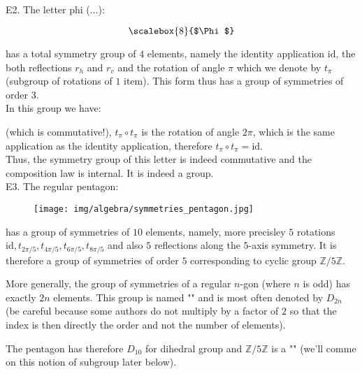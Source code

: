 	\pagebreak
	\begin{tcolorbox}[colframe=black,colback=white,sharp corners]
	E2. The letter phi (...):
	\begin{center}
	\[ \scalebox{8}{$\Phi$} \]
	\end{center}
	has a total symmetry group of $4$ elements, namely the identity application $\text{id}$, the both reflections $r_h$ and $r_v$ and the rotation of angle $\pi$ which we denote by $t_\pi$ (subgroup of rotations of $1$ item). This form thus has a group of symmetries of order $3$.\\
	
	In this group we have:
	
 	(which is commutative!), $t_{\pi}\circ t_{\pi}$ is the rotation of angle $2\pi$, which is the same application as the identity application, therefore $t_{\pi}\circ t_\pi=\text{id}$.\\
 	
 	Thus, the symmetry group of this letter is indeed commutative and the composition law is internal. It is indeed a group.\\
 	
 	E3. The regular pentagon:
 	\begin{figure}[H]
		\centering
		\texttt{[image: img/algebra/symmetries\_pentagon.jpg]}
	\end{figure}
	has a group of symmetries of $10$ elements, namely, more precisley  $5$ rotations $\text{id},t_{2\pi/5},t_{4\pi/5},t_{6\pi/5},t_{8\pi/5}$ and also $5$ reflections along the $5$-axis symmetry. It is therefore a group of symmetries of order $5$ corresponding to cyclic group $\mathbb{Z}/ 5\mathbb{Z}$.\\
	
	\begin{tcolorbox}[title=Remark,colframe=black,arc=10pt]
More generally, the group of symmetries of a regular $n$-gon (where $n$ is odd) has exactly $2n$ elements. This group is named "" and is most often denoted by $D_{2n}$ (be careful because some authors do not multiply by a factor of $2$ so that the index is then directly the order and not the number of elements).
	\end{tcolorbox}	
	The pentagon has therefore $D_{10}$ for dihedral group and $\mathbb{Z}/ 5\mathbb{Z}$ is a "" (we'll comme on this notion of subgroup later below).
	\end{tcolorbox}
	
